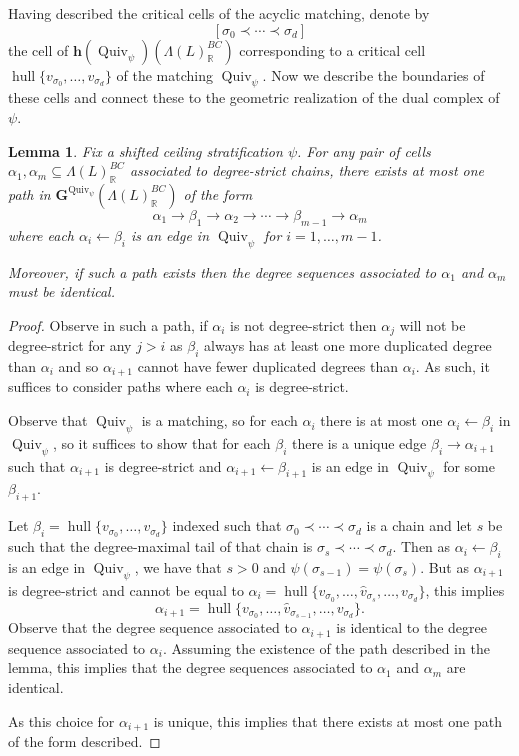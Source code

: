 \documentclass{amsart}
\newcommand{\RR}{\mathbb{R}}
\newcommand{\homotopy}{\mathbf{h}}
\newcommand{\graph}{\mathbf{G}}
\newcommand{\Quiv}{\operatorname{Quiv}}
\DeclareMathOperator{\hull}{hull}
\newtheorem{lemma}[theorem]{Lemma}
\theoremstyle{remark}
\begin{document}
Having described the critical cells of the acyclic matching, denote by
\[
[\sigma_0\prec \cdots\prec \sigma_d]
\]
the cell of $\homotopy(\Quiv_\psi)(\Lambda(L)_{\RR}^{BC})$ corresponding to a critical cell $\hull\{v_{\sigma_0},\ldots,v_{\sigma_d}\}$ of the matching $\Quiv_\psi$. Now we describe the boundaries of these cells and connect these to the geometric realization of the dual complex of $\psi$.

\begin{lemma}
  \label{lem:unique-paths}
  Fix a shifted ceiling stratification $\psi$.
  For any pair of cells $\alpha_1,\alpha_m\subseteq \Lambda(L)_{\RR}^{BC}$ associated to degree-strict chains, there exists at most one path in $\graph^{\Quiv_\psi}(\Lambda(L)_{\RR}^{BC})$ of the form
  \[\alpha_1\rightarrow \beta_1 \rightarrow \alpha_2 \rightarrow \cdots \rightarrow \beta_{m-1} \rightarrow \alpha_m\]
  where each $\alpha_i\leftarrow \beta_i$ is an edge in $\Quiv_\psi$ for $i=1,\ldots,m-1$.

  Moreover, if such a path exists then the degree sequences associated to $\alpha_1$ and $\alpha_m$ must be identical.
\end{lemma}
\begin{proof}
  Observe in such a path, if $\alpha_i$ is not degree-strict then $\alpha_j$ will not be degree-strict for any $j>i$ as $\beta_i$ always has at least one more duplicated degree than $\alpha_i$ and so $\alpha_{i+1}$ cannot have fewer duplicated degrees than $\alpha_i$. As such, it suffices to consider paths where each $\alpha_i$ is degree-strict.

  Observe that $\Quiv_\psi$ is a matching, so for each $\alpha_i$ there is at most one $\alpha_i\leftarrow \beta_i$ in $\Quiv_\psi$, so it suffices to show that for each $\beta_i$ there is a unique edge $\beta_{i}\rightarrow \alpha_{i+1}$ such that $\alpha_{i+1}$ is degree-strict and $\alpha_{i+1}\leftarrow \beta_{i+1}$ is an edge in $\Quiv_\psi$ for some $\beta_{i+1}$.

  Let $\beta_i=\hull\{v_{\sigma_0},\ldots,v_{\sigma_d}\}$ indexed such that
  $\sigma_0\prec \cdots\prec \sigma_d$
  is a chain and let $s$ be such that the degree-maximal tail of that chain is
  $\sigma_{s}\prec \cdots \prec \sigma_d.$
  Then as $\alpha_i\leftarrow \beta_i$ is an edge in $\Quiv_\psi$, we have that $s>0$ and $\psi(\sigma_{s-1})=\psi(\sigma_s)$.
  But as $\alpha_{i+1}$ is degree-strict and cannot be equal to $\alpha_i=\hull\{v_{\sigma_0},\ldots,\widehat{v}_{\sigma_s},\ldots,v_{\sigma_d}\}$, this implies
  \[\alpha_{i+1}=\hull\{v_{\sigma_0},\ldots,\widehat{v}_{\sigma_{s-1}},\ldots,v_{\sigma_d}\}.\]
  Observe that the degree sequence associated to $\alpha_{i+1}$ is identical to the degree sequence associated to $\alpha_{i}$. Assuming the existence of the path described in the lemma, this implies that the degree sequences associated to $\alpha_1$ and $\alpha_m$ are identical.

  As this choice for $\alpha_{i+1}$ is unique, this implies that there exists at most one path of the form described.
\end{proof}
\end{document}

